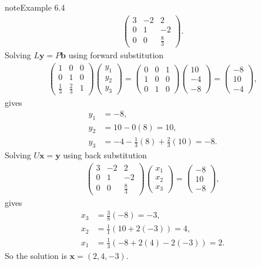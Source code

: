 \documentclass[letterpaper,10pt,english]{jupyterBook}
\begin{document}
\begin{sphinxadmonition}{note}{Example 6.4}
\begin{align*}
\begin{pmatrix}
        3 & -2 & 2\\
        0 & 1 & -2\\
        0 & 0 & \frac{8}{3}
    \end{pmatrix}.
\end{align*}
\sphinxAtStartPar
Solving \(L \mathbf{y} = P \mathbf{b}\) using forward substitution
\begin{align*}
    \begin{pmatrix}
        1 & 0 & 0\\
        0 & 1 & 0\\
        \frac{1}{3} & \frac{2}{3} & 1
    \end{pmatrix}
    \begin{pmatrix} y_1 \\ y_2 \\ y_3 \end{pmatrix} =
    \begin{pmatrix}
        0 & 0 & 1\\
        1 & 0 & 0\\
        0 & 1 & 0
    \end{pmatrix}
    \begin{pmatrix} 10 \\ -4 \\ -8 \end{pmatrix} =
    \begin{pmatrix} -8 \\ 10 \\ -4 \end{pmatrix},
\end{align*}
\sphinxAtStartPar
gives
\begin{align*}
    y_1 &= -8, \\
    y_2 &= 10 - 0(8)=10, \\
    y_3 &= -4 - \frac{1}{3}(8) + \frac{2}{3}(10) = -8.
\end{align*}
\sphinxAtStartPar
Solving \(U \mathbf{x} = \mathbf{y}\) using back substitution
\begin{align*}
    \begin{pmatrix}
        3 & -2 & 2\\
        0 & 1 & -2\\
        0 & 0 & \frac{8}{3}
    \end{pmatrix}
    \begin{pmatrix} x_1 \\ x_2 \\ x_3 \end{pmatrix} = 
    \begin{pmatrix} -8 \\ 10 \\ -8 \end{pmatrix},
\end{align*}
\sphinxAtStartPar
gives
\begin{align*}
    x_3 &= \frac{3}{8}(-8) = -3, \\
    x_2 &= \frac{1}{1}(10+2(-3)) = 4, \\
    x_1 &= \frac{1}{3}(-8+2(4)-2(-3)) = 2.
\end{align*}
\sphinxAtStartPar
So the solution is \(\mathbf{x}=(2,4,-3)\).
\end{sphinxadmonition}
\end{document}
